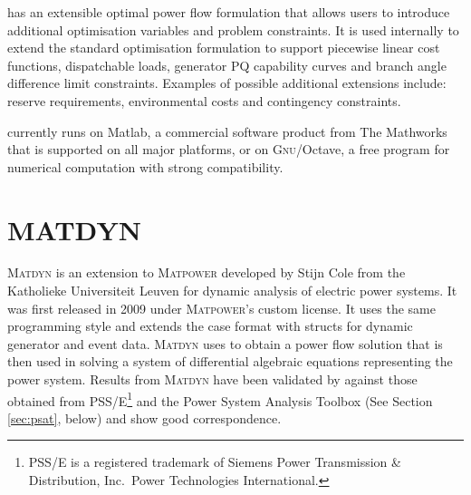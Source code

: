 \matpower has an extensible optimal power flow formulation that allows users
to introduce additional optimisation variables and problem constraints.  It is
used internally to extend the standard optimisation formulation to support
piecewise linear cost functions, dispatchable loads, generator PQ capability
curves and branch angle difference limit constraints. Examples of possible
additional extensions include: reserve requirements, environmental costs and
contingency constraints.

\matpower currently runs on Matlab, a
commercial software product from The Mathworks that is supported on all
major platforms, or on \textsc{Gnu}/Octave, a free
program for numerical computation with strong \matlab compatibility.

\section{MATDYN}
\textsc{Matdyn} is an extension to \textsc{Matpower} developed by Stijn Cole
from the Katholieke Universiteit Leuven for dynamic analysis of electric power
systems. It was first released in 2009 under \textsc{Matpower}'s custom license.
It uses the same programming style and extends the \matpower case format with
structs for dynamic generator and event data.  \textsc{Matdyn} uses \matpower to
obtain a power flow solution that is then used in solving a system of
differential algebraic equations representing the power system. Results from
\textsc{Matdyn} have been validated by  against those
obtained from PSS/E\footnote{PSS/E is a registered trademark of Siemens Power
Transmission \& Distribution, Inc.~Power Technologies International.} and the
Power System Analysis Toolbox (See Section \ref{sec:psat}, below) and show good
correspondence.

